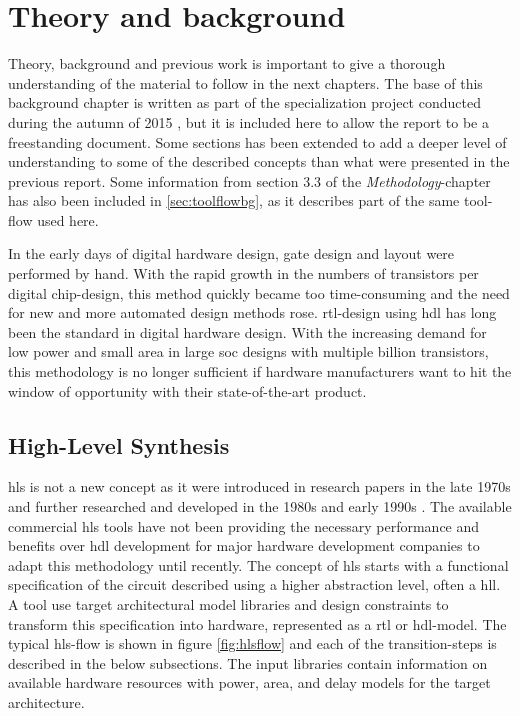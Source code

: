 \chapter{\label{chp:background}Theory and background}
Theory, background and previous work is important to give a thorough understanding of the material to follow in the next chapters. The base of this background chapter is written as part of the specialization project conducted during the autumn of 2015 \cite{holm2015pro}, but it is included here to allow the report to be a freestanding document. Some sections has been extended to add a deeper level of understanding to some of the described concepts than what were presented in the previous report. Some information from section 3.3 of the \textit{Methodology}-chapter has also been included in \cref{sec:toolflowbg}, as it describes part of the same tool-flow used here.

In the early days of digital hardware design, gate design and layout were performed by hand. With the rapid growth in the numbers of transistors per digital chip-design, this method quickly became too time-consuming and the need for new and more automated design methods rose. \gls{rtl}-design using \gls{hdl} has long been the standard in digital hardware design. With the increasing demand for low power and small area in large \gls{soc} designs with multiple billion transistors, this methodology is no longer sufficient if hardware manufacturers want to hit the window of opportunity with their state-of-the-art product.

\section{\label{sec:hls}High-Level Synthesis}

\gls{hls} is not a new concept as it were introduced in research papers in the late 1970s and further researched and developed in the 1980s and early 1990s \cite{martin2009high}. The available commercial \gls{hls} tools have not been providing the necessary performance and benefits over \gls{hdl} development for major hardware development companies to adapt this methodology until recently.
The concept of \gls{hls} starts with a functional specification of the circuit described using a higher abstraction level, often a \gls{hll}. A tool use target architectural model libraries and design constraints to transform this specification into hardware, represented as a \gls{rtl} or \gls{hdl}-model. The typical \gls{hls}-flow is shown in figure \ref{fig:hlsflow} and each of the transition-steps is described in the below subsections. The input libraries contain information on available hardware resources with power, area, and delay models for the target architecture.

